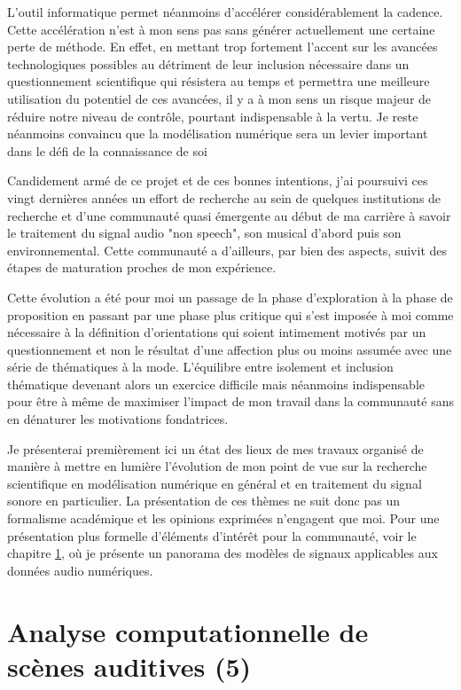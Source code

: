L'outil informatique permet néanmoins d'accélérer considérablement la cadence. Cette accélération n'est à mon sens pas sans générer actuellement une certaine perte de méthode. En effet, en mettant trop fortement l'accent sur les avancées technologiques possibles au détriment de leur inclusion nécessaire dans un questionnement scientifique qui résistera au temps et permettra une meilleure utilisation du potentiel de ces avancées, il y a à mon sens un risque majeur de réduire notre niveau de contrôle, pourtant indispensable à la vertu. Je reste néanmoins convaincu que la modélisation numérique sera un levier important dans le défi de la connaissance de soi

Candidement armé de ce projet et de ces bonnes intentions, j'ai poursuivi ces vingt dernières années un effort de recherche au sein de quelques institutions de recherche et d'une communauté quasi émergente au début de ma carrière à savoir le traitement du signal audio "non speech", son musical d'abord puis son environnemental. Cette communauté a d'ailleurs, par bien des aspects, suivit des étapes de maturation proches de mon expérience.

Cette évolution a été pour moi un passage de la phase d'exploration à la phase de proposition en passant par une phase plus critique qui s'est imposée à moi comme nécessaire à la définition d'orientations qui soient intimement motivés par un questionnement et non le résultat d'une affection plus ou moins assumée avec une série de thématiques à la mode. L'équilibre entre isolement et inclusion thématique devenant alors un exercice difficile mais néanmoins indispensable pour être à même de maximiser l'impact de mon travail dans la communauté sans en dénaturer les motivations fondatrices.

Je présenterai premièrement ici un état des lieux de mes travaux organisé de manière à mettre en lumière l'évolution de mon point de vue sur la recherche scientifique en modélisation numérique en général et en traitement du signal sonore en particulier. La présentation de ces thèmes ne suit donc pas un formalisme académique et les opinions exprimées n'engagent que moi. Pour une présentation plus formelle d'éléments d'intérêt pour la communauté, voir le chapitre \ref{}, où je présente un panorama des modèles de signaux applicables aux données audio numériques.

\section{Analyse computationnelle de scènes auditives (5)}

